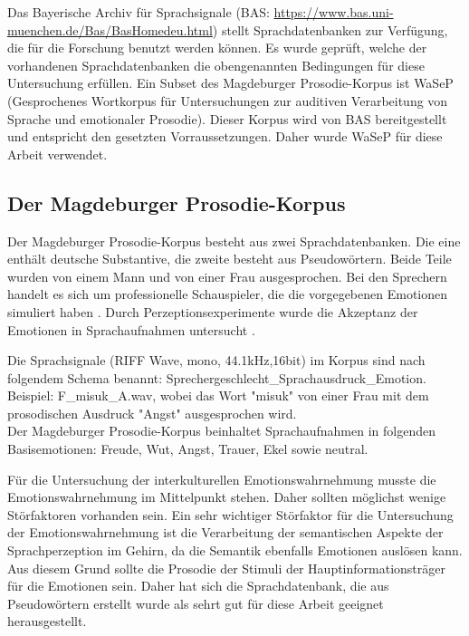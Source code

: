 \documentclass[11pt,a4paper,headsepline,twoside,toc=bibliography]{scrreprt}
\begin{document}
Das Bayerische Archiv für Sprachsignale (BAS: \url{https://www.bas.uni-muenchen.de/Bas/BasHomedeu.html}) stellt Sprachdatenbanken zur Verfügung, die für die Forschung benutzt werden können. Es wurde geprüft, welche der vorhandenen Sprachdatenbanken die obengenannten Bedingungen für diese Untersuchung erfüllen. Ein Subset des Magdeburger Prosodie-Korpus ist WaSeP (Gesprochenes Wortkorpus für Untersuchungen zur auditiven Verarbeitung
von Sprache und emotionaler Prosodie). Dieser Korpus wird von BAS bereitgestellt und entspricht den gesetzten Vorraussetzungen. Daher wurde WaSeP für diese Arbeit verwendet. \\
 

\subsection{Der Magdeburger Prosodie-Korpus}

Der Magdeburger Prosodie-Korpus besteht aus zwei Sprachdatenbanken. Die eine enthält deutsche Substantive, die zweite besteht aus Pseudowörtern. Beide Teile wurden von einem Mann und von einer Frau ausgesprochen. Bei den  Sprechern handelt es sich um professionelle Schauspieler, die die vorgegebenen Emotionen simuliert haben \autocite[s. 86]{Wendt2006} .  Durch Perzeptionsexperimente wurde die Akzeptanz der Emotionen in Sprachaufnahmen untersucht \autocite{Wendt2003}.

Die Sprachsignale (RIFF Wave, mono, 44.1kHz,16bit) im Korpus sind nach folgendem Schema benannt:  Sprechergeschlecht\_Sprachausdruck\_Emotion. Beispiel: F\_misuk\_A.wav, wobei das Wort "misuk" von einer Frau mit dem prosodischen Ausdruck "Angst" ausgesprochen wird.\\
 
Der Magdeburger Prosodie-Korpus beinhaltet Sprachaufnahmen in folgenden Basisemotionen: Freude, Wut, Angst, Trauer, Ekel sowie neutral. 

Für die Untersuchung der interkulturellen Emotionswahrnehmung musste die Emotionswahrnehmung im Mittelpunkt stehen. Daher sollten möglichst wenige Störfaktoren vorhanden sein. Ein sehr wichtiger Störfaktor für die Untersuchung der Emotionswahrnehmung ist die Verarbeitung der semantischen Aspekte der Sprachperzeption im Gehirn, da die Semantik ebenfalls Emotionen auslösen kann. Aus diesem Grund sollte die Prosodie der Stimuli der Hauptinformationsträger für die Emotionen sein. Daher hat sich die Sprachdatenbank, die aus Pseudowörtern erstellt wurde als sehrt gut für diese Arbeit geeignet herausgestellt. 
\end{document}
